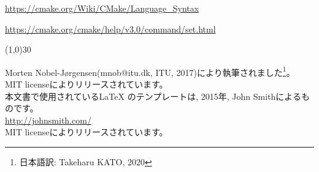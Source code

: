 \documentclass[uplatex,11pt,a4paper,landscape,dvipdfmx]{jsarticle} %
\begin{document}
\begin{multicols}{2}
\url{https://cmake.org/Wiki/CMake/Language_Syntax}

\url{https://cmake.org/cmake/help/v3.0/command/set.html}


\vspace{\baselineskip}
\linethickness{0.5mm} %
{\color{mygray}\line(1,0){30}} %

\footnotesize{
Morten Nobel-Jørgensen(mnob@itu.dk, ITU, 2017)により執筆されました\footnote{日本語訳: Takeharu KATO, 2020}。\\ 
MIT licenseによりリリースされています。\\

本文書で使用されている{\LaTeX} のテンプレートは, 2015年, John Smithによるものです。\\ 
\url{http://johnsmith.com/}\\
				
MIT licenseによりリリースされています。 
}

\end{multicols}

\end{document}
